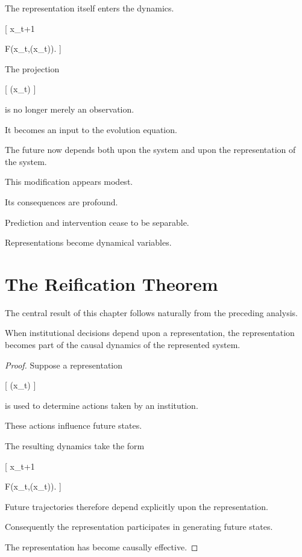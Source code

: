 \documentclass[11pt,oneside,openany]{book}
\begin{document}
The representation itself enters the dynamics.

[
x_{t+1}

F\big(x_t,\pi(x_t)\big).
]

The projection

[
\pi(x_t)
]

is no longer merely an observation.

It becomes an input to the evolution equation.

The future now depends both upon the system and upon the representation of the system.

This modification appears modest.

Its consequences are profound.

Prediction and intervention cease to be separable.

Representations become dynamical variables.

\section{The Reification Theorem}

The central result of this chapter follows naturally from the preceding analysis.

\begin{theorem}

When institutional decisions depend upon a representation, the representation becomes part of the causal dynamics of the represented system.

\end{theorem}

\begin{proof}

Suppose a representation

[
\pi(x_t)
]

is used to determine actions taken by an institution.

These actions influence future states.

The resulting dynamics take the form

[
x_{t+1}

F\big(x_t,\pi(x_t)\big).
]

Future trajectories therefore depend explicitly upon the representation.

Consequently the representation participates in generating future states.

The representation has become causally effective.

\end{proof}
\end{document}
